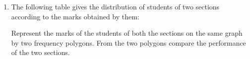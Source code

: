 \renewcommand{\theequation}{\theenumi}
\begin{enumerate}[label=\thesection.\arabic*.,ref=\thesection.\theenumi]
\item The following table gives the distribution
of students of two sections according to the
marks obtained by them:
\begin{table}[!ht]
\centering

\label{table:Q42}	
\end{table}
Represent the marks of the students of both the sections on the same graph by two frequency polygons. From the two polygons compare the performance of the two sections.
\end{enumerate}